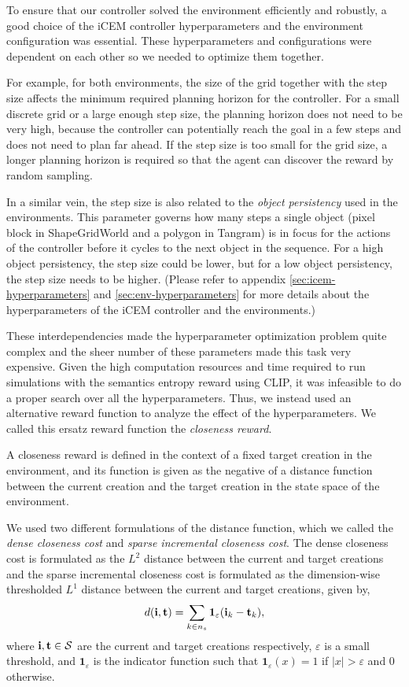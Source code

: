 To ensure that our controller solved the environment efficiently and robustly, a good choice of the iCEM controller hyperparameters and the environment configuration was essential.
These hyperparameters and configurations were dependent on each other so we needed to optimize them together.

For example, for both environments, the size of the grid together with the step size affects the minimum required planning horizon for the controller.
For a small discrete grid or a large enough step size, the planning horizon does not need to be very high, because the controller can potentially reach the goal in a few steps and does not need to plan far ahead.
If the step size is too small for the grid size, a longer planning horizon is required so that the agent can discover the reward by random sampling.

In a similar vein, the step size is also related to the \emph{object persistency} used in the environments.
This parameter governs how many steps a single object (pixel block in ShapeGridWorld and a polygon in Tangram) is in focus for the actions of the controller before it cycles to the next object in the sequence.
For a high object persistency, the step size could be lower, but for a low object persistency, the step size needs to be higher.
(Please refer to appendix \ref{sec:icem-hyperparameters} and \ref{sec:env-hyperparameters} for more details about the hyperparameters of the iCEM controller and the environments.)

These interdependencies made the hyperparameter optimization problem quite complex and the sheer number of these parameters made this task very expensive.
Given the high computation resources and time required to run simulations with the semantics entropy reward using CLIP, it was infeasible to do a proper search over all the hyperparameters.
Thus, we instead used an alternative reward function to analyze the effect of the hyperparameters.
We called this ersatz reward function the \emph{closeness reward}.

A closeness reward is defined in the context of a fixed target creation in the environment, and its function is given as the negative of a distance function between the current creation and the target creation in the state space of the environment.

We used two different formulations of the distance function, which we called the \emph{dense closeness cost} and \emph{sparse incremental closeness cost}.
The dense closeness cost is formulated as the \(L^2\) distance between the current and target creations and the sparse incremental closeness cost is formulated as the dimension-wise thresholded \(L^1\) distance between the current and target creations, given by,
\begin{equation}
    \label{eq:closeness-reward-sparse}
    d(\mathbf{i}, \mathbf{t}) = \sum_{k \in n_s} \bm{1}_\varepsilon(\mathbf{i}_k - \mathbf{t}_k),
\end{equation}
where \(\mathbf{i}, \mathbf{t} \in \mathcal{S}\) are the current and target creations respectively, \(\varepsilon\) is a small threshold, and \(\bm{1}_\varepsilon\) is the indicator function such that \(\bm{1}_\varepsilon(x) = 1\) if \(|x| > \varepsilon\) and \(0\) otherwise.

